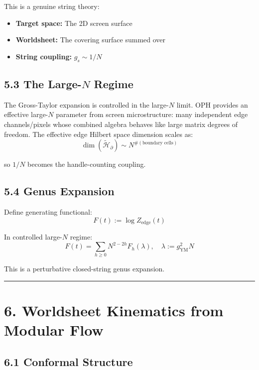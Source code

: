 This is a genuine string theory:

\begin{itemize}
\tightlist
\item
  \textbf{Target space:} The 2D screen surface
\item
  \textbf{Worldsheet:} The covering surface summed over
\item
  \textbf{String coupling:} \(g_s \sim 1/N\)
\end{itemize}

\subsection{\texorpdfstring{5.3 The Large-\(N\) Regime}{5.3 The Large-N Regime}}\label{53-the-large-n-regime}

The Gross-Taylor expansion is controlled in the large-\(N\) limit. OPH provides an effective large-\(N\) parameter from screen microstructure: many independent edge channels/pixels whose combined algebra behaves like large matrix degrees of freedom. The effective edge Hilbert space dimension scales as: \[\dim(\tilde{\mathcal{H}}_\partial) \sim N^{\#(\text{boundary cells})}\]

so \(1/N\) becomes the handle-counting coupling.

\subsection{5.4 Genus Expansion}\label{54-genus-expansion}

Define generating functional: \[F(t) := \log Z_{\text{edge}}(t)\]

In controlled large-\(N\) regime: \[F(t) = \sum_{h \geq 0} N^{2-2h} F_h(\lambda), \quad \lambda := g_{\text{YM}}^2 N\]

This is a perturbative closed-string genus expansion.

\begin{center}\rule{0.5\linewidth}{0.5pt}\end{center}

\section{6. Worldsheet Kinematics from Modular Flow}\label{6-worldsheet-kinematics-from-modular-flow}

\subsection{6.1 Conformal Structure}\label{61-conformal-structure}


